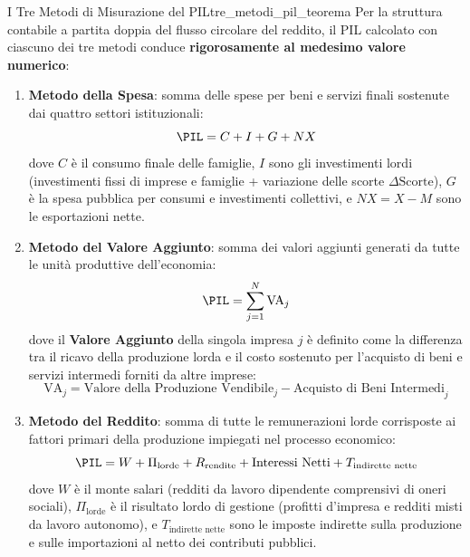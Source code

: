 \begin{teorema}{I Tre Metodi di Misurazione del PIL}{tre_metodi_pil_teorema}
Per la struttura contabile a partita doppia del flusso circolare del reddito, il PIL calcolato con ciascuno dei tre metodi conduce \textbf{rigorosamente al medesimo valore numerico}:
\begin{enumerate}
    \item \textbf{Metodo della Spesa}: somma delle spese per beni e servizi finali sostenute dai quattro settori istituzionali:
    \begin{equation}
        \PIL = C + I + G + NX
    \end{equation}
    dove $C$ è il consumo finale delle famiglie, $I$ sono gli investimenti lordi (investimenti fissi di imprese e famiglie + variazione delle scorte $\Delta \text{Scorte}$), $G$ è la spesa pubblica per consumi e investimenti collettivi, e $NX = X - M$ sono le esportazioni nette.
    
    \item \textbf{Metodo del Valore Aggiunto}: somma dei valori aggiunti generati da tutte le unità produttive dell'economia:
    \begin{equation}
        \PIL = \sum_{j=1}^{N} \mathrm{VA}_j
    \end{equation}
    dove il \textbf{Valore Aggiunto} della singola impresa $j$ è definito come la differenza tra il ricavo della produzione lorda e il costo sostenuto per l'acquisto di beni e servizi intermedi forniti da altre imprese:
    \begin{equation}
        \mathrm{VA}_j = \text{Valore della Produzione Vendibile}_j - \text{Acquisto di Beni Intermedi}_j
    \end{equation}
    
    \item \textbf{Metodo del Reddito}: somma di tutte le remunerazioni lorde corrisposte ai fattori primari della produzione impiegati nel processo economico:
    \begin{equation}
        \PIL = W + \Pi_{\text{lorde}} + R_{\text{rendite}} + \text{Interessi Netti} + T_{\text{indirette nette}}
    \end{equation}
    dove $W$ è il monte salari (redditi da lavoro dipendente comprensivi di oneri sociali), $\Pi_{\text{lorde}}$ è il risultato lordo di gestione (profitti d'impresa e redditi misti da lavoro autonomo), e $T_{\text{indirette nette}}$ sono le imposte indirette sulla produzione e sulle importazioni al netto dei contributi pubblici.
\end{enumerate}
\end{teorema}

